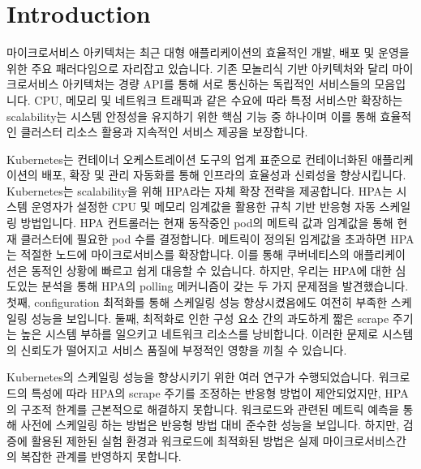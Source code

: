 \documentclass[conference]{IEEEtran}
\begin{document}

\section{Introduction}
마이크로서비스 아키텍처는 최근 대형 애플리케이션의 효율적인 개발, 배포 및 운영을 위한 주요 패러다임으로 자리잡고 있습니다. 기존 모놀리식 기반 아키텍처와 달리 마이크로서비스 아키텍처는 경량 API\cite{RedHatMicroservices}를 통해 서로 통신하는 독립적인 서비스들의 모음입니다. CPU, 메모리 및 네트워크 트래픽과 같은 수요에 따라 특정 서비스만 확장하는 scalability는 시스템 안정성을 유지하기 위한 핵심 기능 중 하나이며 이를 통해 효율적인 클러스터 리소스 활용과 지속적인 서비스 제공을 보장합니다.

Kubernetes\cite{KubernetesOfficial}는 컨테이너 오케스트레이션 도구의 업계 표준으로 컨테이너화된 애플리케이션의 배포, 확장 및 관리 자동화를 통해 인프라의 효율성과 신뢰성을 향상시킵니다. Kubernetes는 scalability을 위해 HPA\cite{KubernetesHPA}라는 자체 확장 전략을 제공합니다. HPA는 시스템 운영자가 설정한 CPU 및 메모리 임계값을 활용한 규칙 기반 반응형 자동 스케일링 방법입니다. HPA 컨트롤러는 현재 동작중인 pod의 메트릭 값과 임계값을 통해 현재 클러스터에 필요한 pod 수를 결정합니다. 메트릭이 정의된 임계값을 초과하면 HPA는 적절한 노드에 마이크로서비스를 확장합니다. 이를 통해 쿠버네티스의 애플리케이션은 동적인 상황에 빠르고 쉽게 대응할 수 있습니다. 하지만, 우리는 HPA에 대한 심도있는 분석을 통해 HPA의 polling 메커니즘이 갖는 두 가지 문제점을 발견했습니다. 첫째, configuration 최적화를 통해 스케일링 성능 향상시켰음에도 여전히 부족한 스케일링 성능을 보입니다. 둘째, 최적화로 인한 구성 요소 간의 과도하게 짧은 scrape 주기는 높은 시스템 부하를 일으키고 네트워크 리소스를 낭비합니다. 이러한 문제로 시스템의 신뢰도가 떨어지고 서비스 품질에 부정적인 영향을 끼칠 수 있습니다.

Kubernetes의 스케일링 성능을 향상시키기 위한 여러 연구가 수행되었습니다. 워크로드의 특성에 따라 HPA의 scrape 주기를 조정하는 반응형 방법\cite{jiang2021fine}이 제안되었지만, HPA의 구조적 한계를 근본적으로 해결하지 못합니다. 워크로드와 관련된 메트릭 예측을 통해 사전에 스케일링 하는 방법\cite{dang2021deep}\cite{he2020novel}\cite{zhao2019research}은 반응형 방법 대비 준수한 성능을 보입니다. 하지만, 검증에 활용된 제한된 실험 환경과 워크로드에 최적화된 방법은 실제 마이크로서비스간의 복잡한 관계를 반영하지 못합니다\cite{huye2023lifting}.
\end{document}
